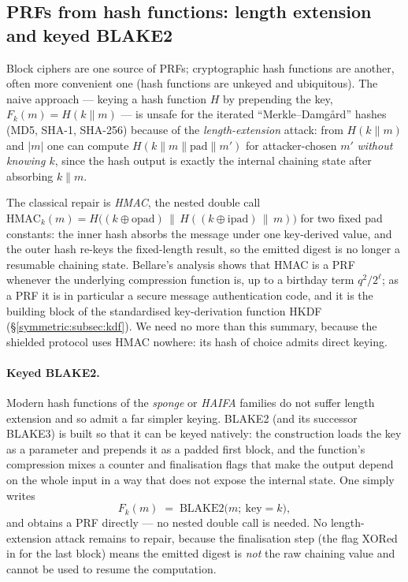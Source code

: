 \documentclass[11pt,a4paper]{article}
\theoremstyle{definition}
\theoremstyle{remark}
\begin{document}
\subsection{PRFs from hash functions: length extension and keyed BLAKE2}\label{prf:ssec:hmac}

Block ciphers are one source of PRFs; cryptographic hash functions are another, often more convenient one (hash functions are unkeyed and ubiquitous). The naive approach --- keying a hash function \(H\) by prepending the key, \(F_k(m) = H(k \parallel m)\) --- is unsafe for the iterated ``Merkle--Damg\aa rd'' hashes (MD5, SHA-1, SHA-256) because of the \emph{length-extension} attack: from \(H(k \parallel m)\) and \(|m|\) one can compute \(H(k \parallel m \parallel \mathrm{pad} \parallel m')\) for attacker-chosen \(m'\) \emph{without knowing \(k\)}, since the hash output is exactly the internal chaining state after absorbing \(k \parallel m\).

The classical repair is \emph{HMAC}, the nested double call
\(\mathrm{HMAC}_k(m) = H\bigl((k \oplus \mathrm{opad}) \,\|\, H((k \oplus \mathrm{ipad}) \,\|\, m)\bigr)\)
for two fixed pad constants: the inner hash absorbs the message under one key-derived value, and the outer hash re-keys the fixed-length result, so the emitted digest is no longer a resumable chaining state. Bellare's analysis shows that HMAC is a PRF whenever the underlying compression function is, up to a birthday term \(q^2/2^{\ell}\); as a PRF it is in particular a secure message authentication code, and it is the building block of the standardised key-derivation function HKDF (\S\ref{symmetric:subsec:kdf}). We need no more than this summary, because the shielded protocol uses HMAC nowhere: its hash of choice admits direct keying.

\paragraph{Keyed BLAKE2.} Modern hash functions of the \emph{sponge} or \emph{HAIFA} families do not suffer length extension and so admit a far simpler keying. BLAKE2 (and its successor BLAKE3) is built so that it can be keyed natively: the construction loads the key as a parameter and prepends it as a padded first block, and the function's compression mixes a counter and finalisation flags that make the output depend on the whole input in a way that does not expose the internal state. One simply writes
\[
  F_k(m) \;=\; \mathrm{BLAKE2}\bigl(m;\ \text{key} = k\bigr),
\]
and obtains a PRF directly --- no nested double call is needed. No length-extension attack remains to repair, because the finalisation step (the flag XORed in for the last block) means the emitted digest is \emph{not} the raw chaining value and cannot be used to resume the computation.
\end{document}
